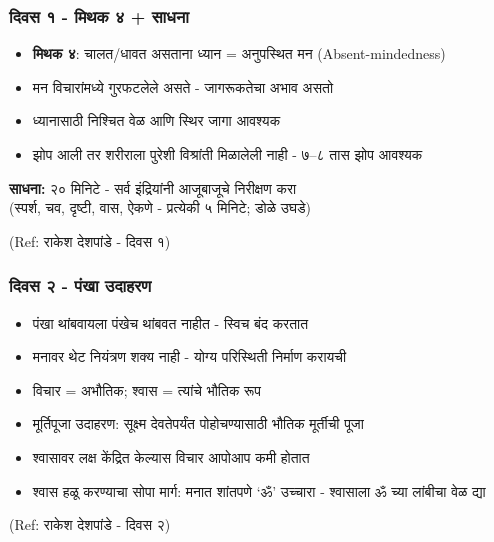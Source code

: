 \begin{frame}[fragile]\frametitle{दिवस १ - मिथक ४ + साधना}

	\begin{itemize}
	\item \textbf{मिथक ४}: चालत/धावत असताना ध्यान = अनुपस्थित मन (Absent-mindedness)
	\item मन विचारांमध्ये गुरफटलेले असते - जागरूकतेचा अभाव असतो
	\item ध्यानासाठी निश्चित वेळ आणि स्थिर जागा आवश्यक
	\item झोप आली तर शरीराला पुरेशी विश्रांती मिळालेली नाही - ७--८ तास झोप आवश्यक
	\end{itemize}

	\vspace{2mm}
	\textbf{साधना:} २० मिनिटे - सर्व इंद्रियांनी आजूबाजूचे निरीक्षण करा \\
	(स्पर्श, चव, दृष्टी, वास, ऐकणे - प्रत्येकी ५ मिनिटे; डोळे उघडे)

{\tiny (Ref: राकेश देशपांडे - दिवस १)}

\end{frame}


\begin{frame}[fragile]\frametitle{दिवस २ - पंखा उदाहरण}

	\begin{itemize}
	\item पंखा थांबवायला पंखेच थांबवत नाहीत - स्विच बंद करतात
	\item मनावर थेट नियंत्रण शक्य नाही - योग्य परिस्थिती निर्माण करायची
	\item विचार = अभौतिक; श्वास = त्यांचे भौतिक रूप
	\item मूर्तिपूजा उदाहरण: सूक्ष्म देवतेपर्यंत पोहोचण्यासाठी भौतिक मूर्तीची पूजा
	\item श्वासावर लक्ष केंद्रित केल्यास विचार आपोआप कमी होतात
	\item श्वास हळू करण्याचा सोपा मार्ग: मनात शांतपणे `ॐ' उच्चारा - श्वासाला ॐ च्या लांबीचा वेळ द्या
	\end{itemize}

{\tiny (Ref: राकेश देशपांडे - दिवस २)}

\end{frame}

